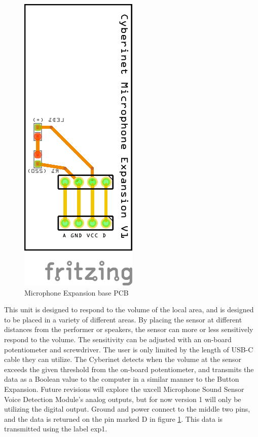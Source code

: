 \begin{figure}
    \centering
    \includegraphics[angle=90]{diagrams/PCBs/micBasic_pcb.png}
    \caption{Microphone Expansion base PCB}
    \label{fig:micExPCB}
\end{figure}

This unit is designed to respond to the volume of the local area, and is designed to be placed in a variety of different areas. By placing the sensor at different distances from the performer or speakers, the sensor can more or less sensitively respond to the volume. The sensitivity can be adjusted with an on-board potentiometer and screwdriver. The user is only limited by the length of USB-C cable they can utilize. The Cyberinet detects when the volume at the sensor exceeds the given threshold from the on-board potentiometer, and transmits the data as a Boolean value to the computer in a similar manner to the Button Expansion. Future revisions will explore the uxcell Microphone Sound Sensor Voice Detection Module's analog outputs, but for now version 1 will only be utilizing the digital output. Ground and power connect to the middle two pins, and the data is returned on the pin marked D in figure \ref{fig:micExPCB}. This data is transmitted using the label exp1. 


